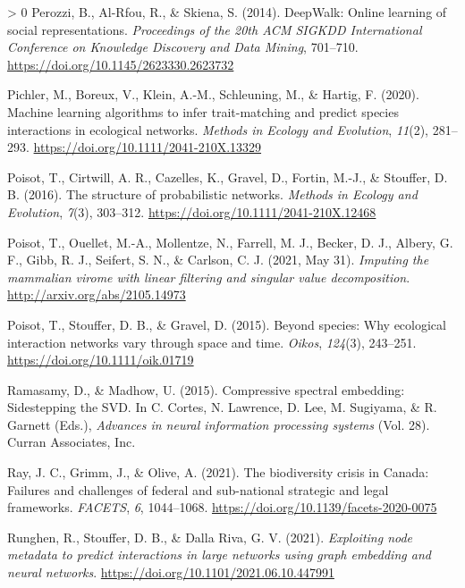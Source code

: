 \documentclass[11pt]{article}
\newlength{\cslhangindent}
\newenvironment{CSLReferences}[3] %
 {%
  \setlength{\parindent}{0pt}
  \ifodd #1 \everypar{\setlength{\hangindent}{\cslhangindent}}\ignorespaces\fi
  \ifnum #2 > 0
  \setlength{\parskip}{#2\baselineskip}
  \fi
 }%
 {}
\begin{document}
\begin{CSLReferences}{1}{0}
\leavevmode\hypertarget{ref-Perozzi2014DeeOnl}{}%
Perozzi, B., Al-Rfou, R., \& Skiena, S. (2014). DeepWalk: Online
learning of social representations. \emph{Proceedings of the 20th ACM
SIGKDD International Conference on Knowledge Discovery and Data Mining},
701--710. \url{https://doi.org/10.1145/2623330.2623732}

\leavevmode\hypertarget{ref-Pichler2020MacLea}{}%
Pichler, M., Boreux, V., Klein, A.-M., Schleuning, M., \& Hartig, F.
(2020). Machine learning algorithms to infer trait-matching and predict
species interactions in ecological networks. \emph{Methods in Ecology
and Evolution}, \emph{11}(2), 281--293.
\url{https://doi.org/10.1111/2041-210X.13329}

\leavevmode\hypertarget{ref-Poisot2016StrPro}{}%
Poisot, T., Cirtwill, A. R., Cazelles, K., Gravel, D., Fortin, M.-J., \&
Stouffer, D. B. (2016). The structure of probabilistic networks.
\emph{Methods in Ecology and Evolution}, \emph{7}(3), 303--312.
\url{https://doi.org/10.1111/2041-210X.12468}

\leavevmode\hypertarget{ref-Poisot2021ImpMam}{}%
Poisot, T., Ouellet, M.-A., Mollentze, N., Farrell, M. J., Becker, D.
J., Albery, G. F., Gibb, R. J., Seifert, S. N., \& Carlson, C. J. (2021,
May 31). \emph{Imputing the mammalian virome with linear filtering and
singular value decomposition}. \url{http://arxiv.org/abs/2105.14973}

\leavevmode\hypertarget{ref-Poisot2015SpeWhy}{}%
Poisot, T., Stouffer, D. B., \& Gravel, D. (2015). Beyond species: Why
ecological interaction networks vary through space and time.
\emph{Oikos}, \emph{124}(3), 243--251.
\url{https://doi.org/10.1111/oik.01719}

\leavevmode\hypertarget{ref-Ramasamy2015ComSpe}{}%
Ramasamy, D., \& Madhow, U. (2015). Compressive spectral embedding:
Sidestepping the SVD. In C. Cortes, N. Lawrence, D. Lee, M. Sugiyama, \&
R. Garnett (Eds.), \emph{Advances in neural information processing
systems} (Vol. 28). Curran Associates, Inc.

\leavevmode\hypertarget{ref-Ray2021BioCri}{}%
Ray, J. C., Grimm, J., \& Olive, A. (2021). The biodiversity crisis in
Canada: Failures and challenges of federal and sub-national strategic
and legal frameworks. \emph{FACETS}, \emph{6}, 1044--1068.
\url{https://doi.org/10.1139/facets-2020-0075}

\leavevmode\hypertarget{ref-Runghen2021ExpNod}{}%
Runghen, R., Stouffer, D. B., \& Dalla Riva, G. V. (2021).
\emph{Exploiting node metadata to predict interactions in large networks
using graph embedding and neural networks}.
\url{https://doi.org/10.1101/2021.06.10.447991}


\end{CSLReferences}
\end{document}
